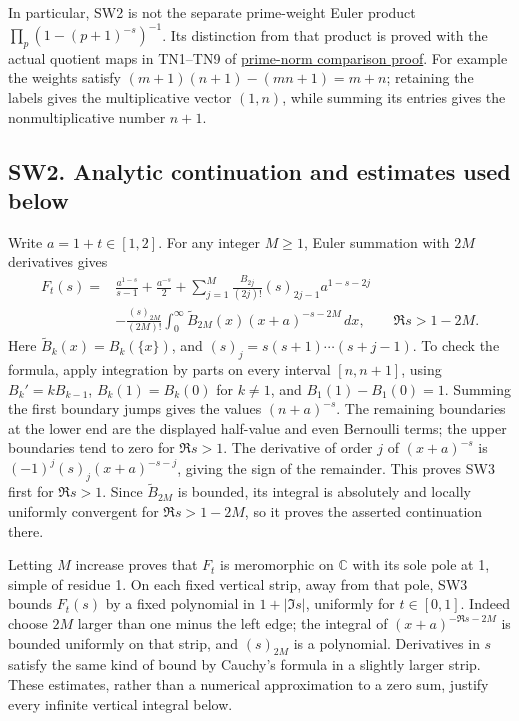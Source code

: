 \documentclass[
  10pt,
  a4paper,
]{article}
\begin{document}
In particular, SW2 is not the separate prime-weight Euler product
\(\prod_p(1-(p+1)^{-s})^{-1}\). Its distinction from that product is
proved with the actual quotient maps in TN1--TN9 of
\href{https://github.com/KokunoYumeto/zeta-function-research-reader/blob/173dbc6ed5a03235dbe7654f928f3692107db39b/workbenches/splitzero-tandem/branches/tau-zero-prime-positivity/TAU_WEIL_NORM_RECONSTRUCTION.md}{prime-norm
comparison proof}. For example the weights satisfy
\((m+1)(n+1)-(mn+1)=m+n\); retaining the labels gives the multiplicative
vector \((1,n)\), while summing its entries gives the nonmultiplicative
number \(n+1\).

\subsection{SW2. Analytic continuation and estimates used
below}\label{sw2.-analytic-continuation-and-estimates-used-below}

Write \(a=1+t\in[1,2]\). For any integer \(M\ge1\), Euler summation with
\(2M\) derivatives gives \[
\begin{split}
F_t(s)={}&\frac{a^{1-s}}{s-1}+\frac{a^{-s}}2
 +\sum_{j=1}^{M}\frac{B_{2j}}{(2j)!}(s)_{2j-1}a^{1-s-2j}\\
&-\frac{(s)_{2M}}{(2M)!}
\int_0^\infty \widetilde B_{2M}(x)(x+a)^{-s-2M}\,dx,
\qquad \Re s>1-2M.
\end{split}
\tag{SW3}
\] Here \(\widetilde B_k(x)=B_k(\{x\})\), and
\((s)_j=s(s+1)\cdots(s+j-1)\). To check the formula, apply integration
by parts on every interval \([n,n+1]\), using \(B_k'=kB_{k-1}\),
\(B_k(1)=B_k(0)\) for \(k\ne1\), and \(B_1(1)-B_1(0)=1\). Summing the
first boundary jumps gives the values \((n+a)^{-s}\). The remaining
boundaries at the lower end are the displayed half-value and even
Bernoulli terms; the upper boundaries tend to zero for \(\Re s>1\). The
derivative of order \(j\) of \((x+a)^{-s}\) is
\((-1)^j(s)_j(x+a)^{-s-j}\), giving the sign of the remainder. This
proves SW3 first for \(\Re s>1\). Since \(\widetilde B_{2M}\) is
bounded, its integral is absolutely and locally uniformly convergent for
\(\Re s>1-2M\), so it proves the asserted continuation there.

Letting \(M\) increase proves that \(F_t\) is meromorphic on
\(\mathbb C\) with its sole pole at 1, simple of residue 1. On each
fixed vertical strip, away from that pole, SW3 bounds \(F_t(s)\) by a
fixed polynomial in \(1+|\Im s|\), uniformly for \(t\in[0,1]\). Indeed
choose \(2M\) larger than one minus the left edge; the integral of
\((x+a)^{-\Re s-2M}\) is bounded uniformly on that strip, and
\((s)_{2M}\) is a polynomial. Derivatives in \(s\) satisfy the same kind
of bound by Cauchy's formula in a slightly larger strip. These
estimates, rather than a numerical approximation to a zero sum, justify
every infinite vertical integral below.
\end{document}
